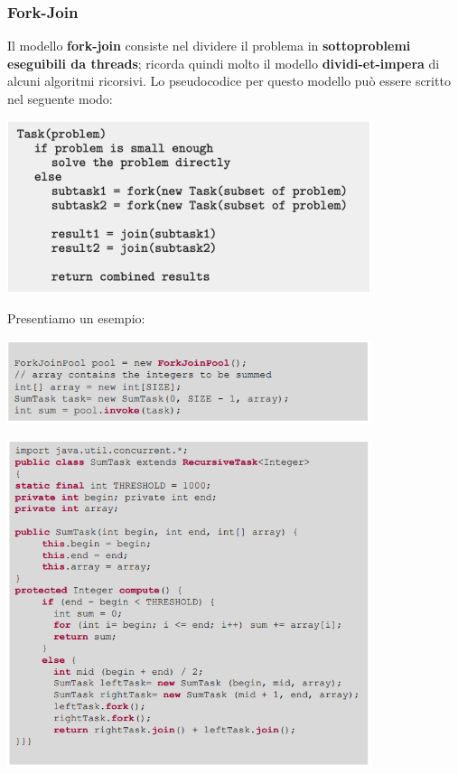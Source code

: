 \documentclass[12pt]{article}
\begin{document}
\subsubsection{Fork-Join}
Il modello \textbf{fork-join} consiste nel dividere il problema in \textbf{sottoproblemi eseguibili da threads}; ricorda quindi molto il modello \textbf{dividi-et-impera} di alcuni algoritmi ricorsivi. Lo pseudocodice per questo modello può essere scritto nel seguente modo:
\begin{center}
    \includegraphics[width = 0.80\textwidth]{Images/77.PNG}
\end{center}
Presentiamo un esempio:
\begin{center}
    \includegraphics[width = 0.80\textwidth]{Images/78.PNG}
\end{center}
\begin{center}
    \includegraphics[width = 0.80\textwidth]{Images/79.PNG}
\end{center}
\end{document}
